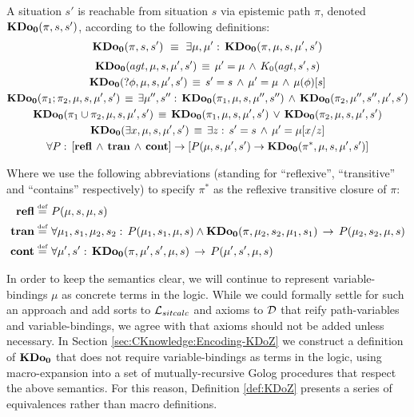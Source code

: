 \begin{defnL}
 A situation $s'$ is reachable
from situation $s$ via epistemic path $\pi$, denoted $\mathbf{KDo_{0}}(\pi,s,s')$,
according to the following definitions:\label{def:KDoZ}\[
\mathbf{KDo_{0}}(\pi,s,s')\,\,\equiv\,\,\exists\mu,\mu':\,\mathbf{KDo_{0}}(\pi,\mu,s,\mu',s')\]
 \begin{gather*}
\mathbf{KDo_{0}}(agt,\mu,s,\mu',s')\,\equiv\,\mu'=\mu\,\wedge\, K_{0}(agt,s',s)\\
\mathbf{KDo_{0}}(?\phi,\mu,s,\mu',s')\,\equiv\, s'=s\,\wedge\,\mu'=\mu\,\wedge\,\mu(\phi)[s]\\
\mathbf{KDo_{0}}(\pi_{1};\pi_{2},\mu,s,\mu',s')\,\equiv\,\exists\mu'',s'':\,\mathbf{KDo_{0}}(\pi_{1},\mu,s,\mu'',s'')\,\wedge\,\mathbf{KDo_{0}}(\pi_{2},\mu'',s'',\mu',s')\\
\mathbf{KDo_{0}}(\pi_{1}\cup\pi_{2},\mu,s,\mu',s')\,\equiv\,\mathbf{KDo_{0}}(\pi_{1},\mu,s,\mu',s')\,\vee\,\mathbf{KDo_{0}}(\pi_{2},\mu,s,\mu',s')\\
\mathbf{KDo_{0}}(\exists x,\mu,s,\mu',s')\,\equiv\,\exists z:\, s'=s\,\wedge\,\mu'=\mu[x/z]\\
\forall P:\,\left[\mathbf{refl}\,\wedge\,\mathbf{tran}\,\wedge\,\mathbf{cont}\right]\rightarrow\left[P(\mu,s,\mu',s')\rightarrow\mathbf{KDo_{0}}(\pi^{*},\mu,s,\mu',s')\right]\end{gather*}

\end{defnL}
Where we use the following abbreviations (standing for {}``reflexive'',
{}``transitive'' and {}``contains'' respectively) to specify $\pi^{*}$
as the reflexive transitive closure of $\pi$:\begin{align*}
\mathbf{refl}\stackrel{\mbox{\tiny def}}{=} & \,\, P(\mu,s,\mu,s)\\
\mathbf{tran\stackrel{\mbox{\tiny def}}{=}} & \,\,\forall\mu_{1},s_{1},\mu_{2},s_{2}:\, P(\mu_{1},s_{1},\mu,s)\wedge\mathbf{KDo_{0}}(\pi,\mu_{2},s_{2},\mu_{1},s_{1})\,\rightarrow\, P(\mu_{2},s_{2},\mu,s)\\
\mathbf{cont}\stackrel{\mbox{\tiny def}}{=} & \,\,\forall\mu',s':\,\mathbf{KDo_{0}}(\pi,\mu',s',\mu,s)\,\rightarrow\, P(\mu',s',\mu,s)\end{align*}


In order to keep the semantics clear, we will continue to represent
variable-bindings $\mu$ as concrete terms in the logic. While we
could formally settle for such an approach and add sorts to $\mathcal{L}_{sitcalc}$
and axioms to $\mathcal{D}$ that reify path-variables and variable-bindings,
we agree with \citet{levesque97golog} that axioms should not be added
unless necessary. In Section \ref{sec:CKnowledge:Encoding-KDoZ} we
construct a definition of $\mathbf{KDo_{0}}$ that does not require variable-bindings
as terms in the logic, using macro-expansion into a set of mutually-recursive
Golog procedures that respect the above semantics. For this reason,
Definition \ref{def:KDoZ} presents a series of equivalences rather
than macro definitions.

